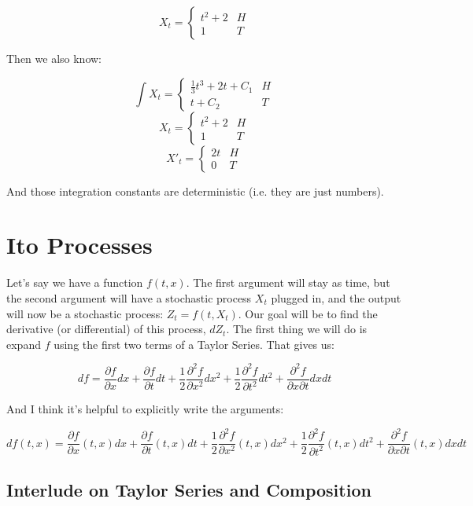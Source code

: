 \documentclass{article}
\begin{document}
\[X_t = \begin{cases} 
    t^2 + 2 & H \\
    1 & T 
 \end{cases}
\]

Then we also know:

\[\int X_t = \begin{cases} 
    \frac{1}{3}t^3 + 2t + C_1 & H \\
    t + C_2 & T 
 \end{cases}
\]
\[X_t = \begin{cases} 
    t^2 + 2 & H \\
    1 & T 
 \end{cases}
\]
\[X'_t = \begin{cases} 
    2t & H \\
    0 & T 
 \end{cases}
\]

And those integration constants are deterministic (i.e. they are just numbers).

\section{Ito Processes}

Let's say we have a function $f(t,x)$.  The first argument will stay as time, but the second argument will have a stochastic process $X_t$ plugged in, and the output will now be a stochastic process: $Z_t = f(t,X_t)$.  Our goal will be to find the derivative (or differential) of this process, $dZ_t$. The first thing we will do is expand $f$ using the first two terms of a Taylor Series. That gives us:

$$df = \frac{\partial f}{\partial x} dx + \frac{\partial f}{\partial t} dt + \frac{1}{2}\frac{\partial^2 f}{\partial x^2} dx^2 + \frac{1}{2}\frac{\partial^2 f}{\partial t^2} dt^2 + \frac{\partial^2 f}{\partial x \partial t} dx dt$$

And I think it's helpful to explicitly write the arguments:

$$df(t,x) = \frac{\partial f}{\partial x}(t,x) dx + \frac{\partial f}{\partial t}(t,x) dt + \frac{1}{2}\frac{\partial^2 f}{\partial x^2}(t,x) dx^2 + \frac{1}{2}\frac{\partial^2 f}{\partial t^2}(t,x) dt^2 + \frac{\partial^2 f}{\partial x \partial t}(t,x) dx dt$$

\subsection{Interlude on Taylor Series and Composition}
\end{document}
